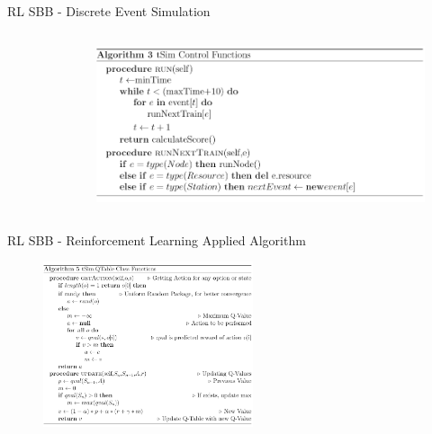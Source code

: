 \documentclass[aspectratio=169]{beamer}
\begin{document}
\begin{frame}{RL SBB - Discrete Event Simulation}
\begin{columns}[T, onlytextwidth]
\begin{column}{0.2\textwidth}
\begin{figure}
            \end{figure}
        \end{column}
        \begin{column}{0.7\textwidth}
            \begin{figure}
                \centering
                \includegraphics[width=\textwidth]{assets/RL/ALG3.PNG}
            \end{figure}
        \end{column}
    \end{columns}
\end{frame}


\begin{frame}{RL SBB - Reinforcement Learning Applied Algorithm}
    \begin{figure}
        \centering
        \includegraphics[width=0.55\textwidth]{assets/RL/ALG4.PNG}
    \end{figure}
\end{frame}
\end{document}
